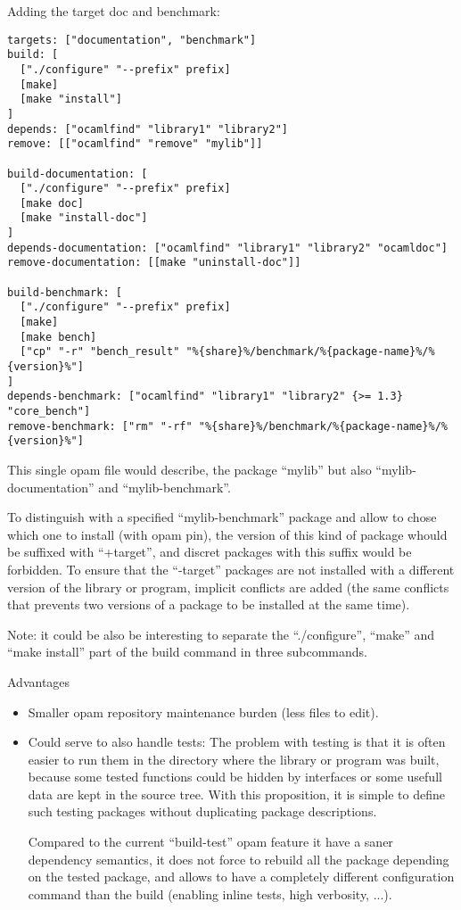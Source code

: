 \documentclass[11pt,a4paper]{article}
\begin{document}
Adding the target doc and benchmark:

\begin{verbatim}
targets: ["documentation", "benchmark"]
build: [
  ["./configure" "--prefix" prefix]
  [make]
  [make "install"]
]
depends: ["ocamlfind" "library1" "library2"]
remove: [["ocamlfind" "remove" "mylib"]]

build-documentation: [
  ["./configure" "--prefix" prefix]
  [make doc]
  [make "install-doc"]
]
depends-documentation: ["ocamlfind" "library1" "library2" "ocamldoc"]
remove-documentation: [[make "uninstall-doc"]]

build-benchmark: [
  ["./configure" "--prefix" prefix]
  [make]
  [make bench]
  ["cp" "-r" "bench_result" "%{share}%/benchmark/%{package-name}%/%{version}%"]
]
depends-benchmark: ["ocamlfind" "library1" "library2" {>= 1.3} "core_bench"]
remove-benchmark: ["rm" "-rf" "%{share}%/benchmark/%{package-name}%/%{version}%"]
\end{verbatim}

This single opam file would describe, the package ``mylib'' but also
``mylib-documentation'' and ``mylib-benchmark''.

To distinguish with a specified ``mylib-benchmark'' package and allow
to chose which one to install (with opam pin), the version of this
kind of package whould be suffixed with ``+target'', and discret
packages with this suffix would be forbidden. To ensure that the
``-target'' packages are not installed with a different version of the
library or program, implicit conflicts are added (the same conflicts
that prevents two versions of a package to be installed at the same
time).

Note: it could be also be interesting to separate the ``./configure'',
``make'' and ``make install'' part of the build command in three
subcommands.

Advantages
\begin{itemize}
\item Smaller opam repository maintenance burden (less files to edit).
\item Could serve to also handle tests: The problem with testing is
  that it is often easier to run them in the directory where the
  library or program was built, because some tested functions could be
  hidden by interfaces or some usefull data are kept in the source
  tree. With this proposition, it is simple to define such testing
  packages without duplicating package descriptions.

  Compared to the current ``build-test'' opam feature it have a saner
  dependency semantics, it does not force to rebuild all the package
  depending on the tested package, and allows to have a completely
  different configuration command than the build (enabling inline
  tests, high verbosity, ...).
\end{itemize}
\end{document}
